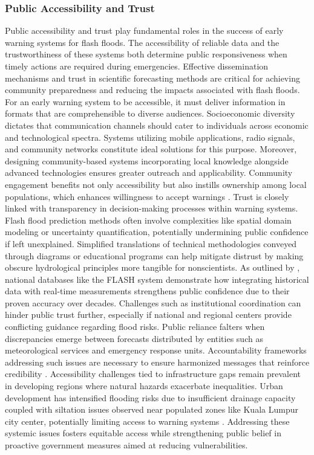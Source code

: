 \subsubsection{Public Accessibility and Trust}
Public accessibility and trust play fundamental roles in the success of early warning systems for flash floods. The accessibility of reliable data and the trustworthiness of these systems both determine public responsiveness when timely actions are required during emergencies. Effective dissemination mechanisms and trust in scientific forecasting methods are critical for achieving community preparedness and reducing the impacts associated with flash floods.
For an early warning system to be accessible, it must deliver information in formats that are comprehensible to diverse audiences. Socioeconomic diversity dictates that communication channels should cater to individuals across economic and technological spectra. Systems utilizing mobile applications, radio signals, and community networks constitute ideal solutions for this purpose. Moreover, designing community-based systems incorporating local knowledge alongside advanced technologies ensures greater outreach and applicability. Community engagement benefits not only accessibility but also instills ownership among local populations, which enhances willingness to accept warnings \citep{Msigwa2024}.
Trust is closely linked with transparency in decision-making processes within warning systems. Flash flood prediction methods often involve complexities like spatial domain modeling or uncertainty quantification, potentially undermining public confidence if left unexplained. Simplified translations of technical methodologies conveyed through diagrams or educational programs can help mitigate distrust by making obscure hydrological principles more tangible for nonscientists. As outlined by \citep{Khajehei2020}, national databases like the FLASH system demonstrate how integrating historical data with real-time measurements strengthens public confidence due to their proven accuracy over decades.
Challenges such as institutional coordination can hinder public trust further, especially if national and regional centers provide conflicting guidance regarding flood risks. Public reliance falters when discrepancies emerge between forecasts distributed by entities such as meteorological services and emergency response units. Accountability frameworks addressing such issues are necessary to ensure harmonized messages that reinforce credibility \citep{Henderson2020}.
Accessibility challenges tied to infrastructure gaps remain prevalent in developing regions where natural hazards exacerbate inequalities. Urban development has intensified flooding risks due to insufficient drainage capacity coupled with siltation issues observed near populated zones like Kuala Lumpur city center, potentially limiting access to warning systems \citep{Maqtan2022a}\citep{Maqtan2022b}. Addressing these systemic issues fosters equitable access while strengthening public belief in proactive government measures aimed at reducing vulnerabilities.
